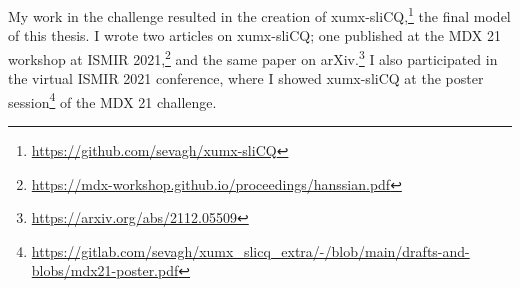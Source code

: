 \documentclass[report.tex]{subfiles}
\begin{document}
\begin{appendices}
My work in the challenge resulted in the creation of xumx-sliCQ,\footnote{\url{https://github.com/sevagh/xumx-sliCQ}} the final model of this thesis. I wrote two articles on xumx-sliCQ; one published at the MDX 21 workshop at ISMIR 2021,\footnote{\url{https://mdx-workshop.github.io/proceedings/hanssian.pdf}} and the same paper on arXiv.\footnote{\url{https://arxiv.org/abs/2112.05509}} I also participated in the virtual ISMIR 2021 conference, where I showed xumx-sliCQ at the poster session\footnote{\url{https://gitlab.com/sevagh/xumx_slicq_extra/-/blob/main/drafts-and-blobs/mdx21-poster.pdf}} of the MDX 21 challenge.

\end{appendices}
\end{document}
